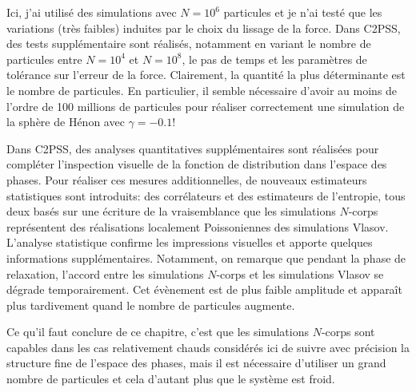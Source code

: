 		Ici, j'ai utilisé des simulations avec $N=10^6$ particules et je n'ai testé que les variations (très faibles) induites par le choix du lissage de la force. Dans
		C2PSS, des tests supplémentaire sont réalisés, notamment en variant le nombre de particules entre $N=10^4$ et $N=10^8$, le pas de temps et les
		paramètres de tolérance sur l'erreur de la force. Clairement, la quantité la plus déterminante est le nombre de particules. En particulier, il semble
		nécessaire d'avoir au moins de l'ordre de 100 millions de particules pour réaliser correctement une simulation de la sphère de Hénon avec $\gamma=-0.1$!

		Dans C2PSS, des analyses quantitatives supplémentaires sont réalisées pour compléter l'inspection visuelle de la fonction de distribution dans l'espace des phases.
		Pour réaliser ces mesures additionnelles, de nouveaux estimateurs statistiques sont introduits: des corrélateurs et des estimateurs de l'entropie, tous deux basés sur
		une écriture de la vraisemblance que les simulations $N$-corps représentent des réalisations localement Poissoniennes des simulations Vlasov.
		L'analyse statistique confirme les impressions visuelles et apporte quelques informations supplémentaires. Notamment, on remarque que pendant la phase de relaxation,
		l'accord entre les simulations $N$-corps et les simulations Vlasov se dégrade temporairement. Cet évènement est de plus faible amplitude et apparaît plus
		tardivement quand le nombre de particules augmente.

		Ce qu'il faut conclure de ce chapitre, c'est que les simulations $N$-corps sont capables dans les cas relativement chauds considérés ici de suivre avec précision la
		structure fine
		de l'espace des phases, mais il est nécessaire d'utiliser un grand nombre de particules et cela d'autant plus que le système est froid.







